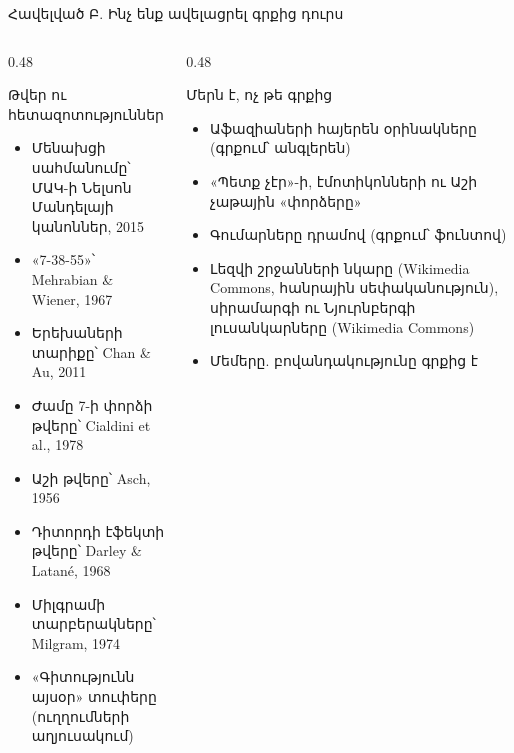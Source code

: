 \begin{frame}{Հավելված Բ. Ինչ ենք ավելացրել գրքից դուրս}
  \begin{columns}[T]
    \begin{column}{0.48\textwidth}
      \begin{card}[colback=mint!30!cardwhite, fontupper=\scriptsize]
        {\blackfont Թվեր ու հետազոտություններ}\par\smallskip
        \begin{itemize}\setlength{\itemsep}{0.5mm}
          \item Մենախցի սահմանումը՝ ՄԱԿ-ի Նելսոն Մանդելայի կանոններ, 2015
          \item «7-38-55»՝ Mehrabian \& Wiener, 1967
          \item Երեխաների տարիքը՝ Chan \& Au, 2011
          \item Ժամը 7-ի փորձի թվերը՝ Cialdini et al., 1978
          \item Աշի թվերը՝ Asch, 1956
          \item Դիտորդի էֆեկտի թվերը՝ Darley \& Latané, 1968
          \item Միլգրամի տարբերակները՝ Milgram, 1974
          \item «Գիտությունն այսօր» տուփերը (ուղղումների աղյուսակում)
        \end{itemize}
      \end{card}
    \end{column}
    \begin{column}{0.48\textwidth}
      \begin{card}[colback=peach!35!cardwhite, fontupper=\scriptsize]
        {\blackfont Մերն է, ոչ թե գրքից}\par\smallskip
        \begin{itemize}\setlength{\itemsep}{0.5mm}
          \item Աֆազիաների հայերեն օրինակները (գրքում՝ անգլերեն)
          \item «Պետք չէր»-ի, էմոտիկոնների ու Աշի չաթային «փորձերը»
          \item Գումարները դրամով (գրքում՝ ֆունտով)
          \item Լեզվի շրջանների նկարը (Wikimedia Commons, հանրային սեփականություն), սիրամարգի ու Նյուրնբերգի լուսանկարները (Wikimedia Commons)
          \item Մեմերը. բովանդակությունը գրքից է
        \end{itemize}
      \end{card}
    \end{column}
  \end{columns}
\end{frame}

